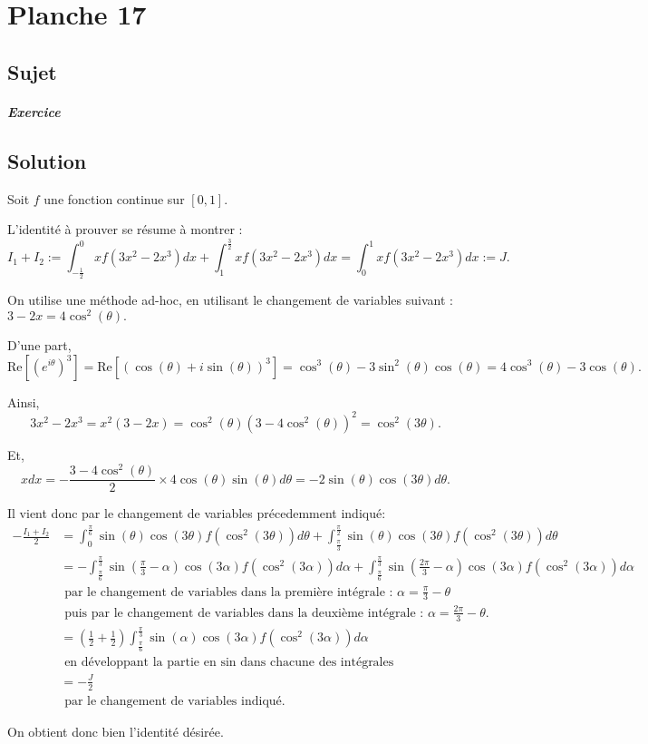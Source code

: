 \chapter{Planche 17}

\section{Sujet}

\paragraph{Exercice}

\section{Solution}

Soit $f$ une fonction continue sur $[0,1].$

L'identité à prouver se résume à montrer : $$I_{1}+I_{2}:=\int_{-\frac{1}{2}}^{0}xf(3x^{2}-2x^{3})dx+\int_{1}^{\frac{3}{2}}xf(3x^{2}-2x^{3})dx=\int_{0}^{1}xf(3x^{2}-2x^{3})dx:=J.$$

On utilise une méthode ad-hoc, en utilisant le changement de variables suivant : $3-2x=4\cos^{2}(\theta).$

D'une part, $$\mbox{Re}[(e^{i\theta})^{3}]=\mbox{Re}[\left(\cos(\theta)+i\sin(\theta)\right)^{3}]=\cos^{3}(\theta)-3\sin^{2}(\theta)\cos(\theta)=4\cos^{3}(\theta)-3\cos(\theta).$$

Ainsi, $$3x^{2}-2x^{3}=x^{2}(3-2x)=\cos^{2}(\theta)\left(3-4\cos^{2}(\theta)\right)^{2}=\cos^{2}(3\theta).$$

Et, $$xdx=-\frac{3-4\cos^{2}(\theta)}{2}\times 4\cos(\theta)\sin(\theta)d\theta=-2\sin(\theta)\cos(3\theta)d\theta.$$

Il vient donc par le changement de variables précedemment indiqué:
\begin{align*}
-\frac{I_{1}+I_{2}}{2} & = \int_{0}^{\frac{\pi}{6}}\sin(\theta)\cos(3\theta)f(\cos^{2}(3\theta))d\theta+\int_{\frac{\pi}{3}}^{\frac{\pi}{2}}\sin(\theta)\cos(3\theta)f(\cos^{2}(3\theta))d\theta\\
& =-\int_{\frac{\pi}{6}}^{\frac{\pi}{3}}\sin(\frac{\pi}{3}-\alpha)\cos(3\alpha)f(\cos^{2}(3\alpha))d\alpha+ \int_{\frac{\pi}{6}}^{\frac{\pi}{3}}\sin(\frac{2\pi}{3}-\alpha)\cos(3\alpha)f(\cos^{2}(3\alpha))d\alpha\\
& \mbox{ par le changement de variables dans la première intégrale : } \alpha=\frac{\pi}{3}-\theta\\
& \mbox{ puis par le changement de variables dans la deuxième intégrale : } \alpha=\frac{2\pi}{3}-\theta.\\
& =(\frac{1}{2}+\frac{1}{2})\int_{\frac{\pi}{6}}^{\frac{\pi}{3}}\sin(\alpha)\cos(3\alpha)f(\cos^{2}(3\alpha))d\alpha\\
& \mbox{ en développant la partie en } \sin  \mbox{ dans chacune des intégrales}\\
& = -\frac{J}{2}\\
& \mbox{ par le changement de variables indiqué. }
\end{align*}

On obtient donc bien l'identité désirée.